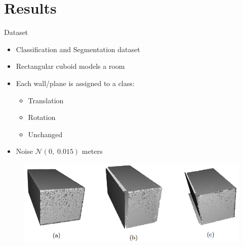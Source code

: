 \documentclass{beamer}
\begin{document}
\section{Results}
\begin{frame}{Dataset}
\begin{minipage}{\textwidth}
    \begin{minipage}{0.44\textwidth}
        \begin{itemize}
            \item Classification and Segmentation dataset
            \item Rectangular cuboid models a room
            \item Each wall/plane is assigned to a class:
            \begin{itemize}
                \item Translation
                \item Rotation
                \item Unchanged
            \end{itemize}
            \item Noise $\mathcal{N}(0,\; 0.015)$ meters
        \end{itemize} 
    \end{minipage}
    \hfill
    \begin{minipage}{0.55\textwidth}
        \begin{figure}
            \centering
            \includegraphics[width = \textwidth]{img/06_rooms.png}
        \end{figure}
    \end{minipage}
\end{minipage}
 \end{frame}
\end{document}
